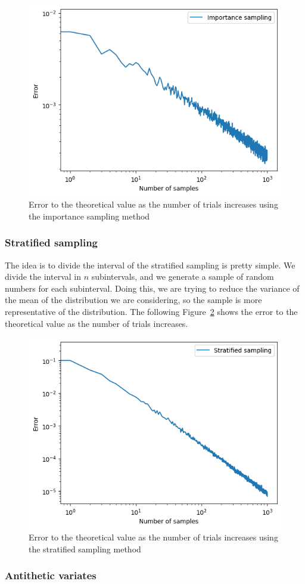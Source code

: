 \documentclass{article}
\begin{document}
\begin{figure}[H]
	\centering
	\includegraphics[width=0.5\linewidth]{./Figures/VarianceReduction/importance.png}
	\caption{Error to the theoretical value as the number of trials increases using the importance sampling method}
	\label{fig:importancesampling}
\end{figure}

\subsubsection{Stratified sampling}

The idea is to divide the interval of the stratified sampling is pretty simple. We divide the interval in \(n\) subintervals, and we generate a sample of random numbers for each subinterval. Doing this, we are trying to reduce the variance of the mean of the distribution we are considering, so the sample is more representative of the distribution. The following Figure~\ref{fig:stratifiedsampling} shows the error to the theoretical value as the number of trials increases.

\begin{figure}[H]
	\centering
	\includegraphics[width=0.5\linewidth]{./Figures/VarianceReduction/stratified.png}
	\caption{Error to the theoretical value as the number of trials increases using the stratified sampling method}
	\label{fig:stratifiedsampling}
\end{figure}

\subsubsection{Antithetic variates}
\end{document}
